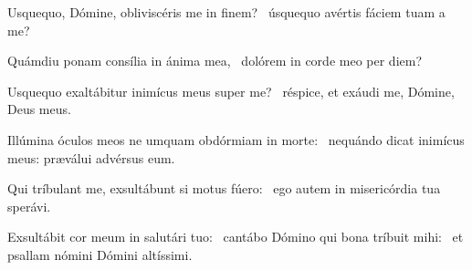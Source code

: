 \item Usquequo, Dómine, obliviscéris me in finem?~\psstar{} úsquequo avértis fáciem tuam a me?

\item Quámdiu ponam consília in ánima mea,~\psstar{} dolórem in corde meo per diem?

\item Usquequo exaltábitur inimícus meus super me?~\psstar{} réspice, et exáudi me, Dómine, Deus meus.

\item Illúmina óculos meos ne umquam obdórmiam in morte:~\psstar{} nequándo dicat inimícus meus: præválui advérsus eum.

\item Qui tríbulant me, exsultábunt si motus fúero:~\psstar{} ego autem in misericórdia tua sperávi.

\item Exsultábit cor meum in salutári tuo:~\pscross{} cantábo Dómino qui bona tríbuit mihi:~\psstar{} et psallam nómini Dómini altíssimi.
